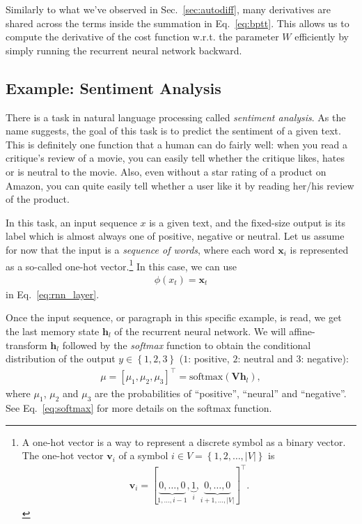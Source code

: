 \documentclass{report}
\newcommand{\softmax}{\text{softmax}}
\newcommand{\vect}[1]{\mathbf{#1}}
\newcommand{\matr}[1]{\mathbf{#1}}
\newcommand{\vh}[0]{\vect{h}}
\newcommand{\vv}[0]{\vect{v}}
\newcommand{\vx}[0]{\vect{x}}
\newcommand{\mV}[0]{\matr{V}}
\begin{document}
Similarly to what we've observed in Sec.~\ref{sec:autodiff}, many derivatives
are shared across the terms inside the summation in Eq.~\eqref{eq:bptt}. This
allows us to compute the derivative of the cost function w.r.t. the
parameter $W$ efficiently by simply running the recurrent neural network
backward. 

\subsection{Example: Sentiment Analysis}

There is a task in natural language processing called {\em sentiment analysis}.
As the name suggests, the goal of this task is to predict the sentiment of a
given text. This is definitely one function that a human can do fairly well:
when you read a critique's review of a movie, you can easily tell whether the
critique likes, hates or is neutral to the movie. Also, even without a star
rating of a product on Amazon, you can quite easily tell whether a user like it
by reading her/his review of the product.

In this task, an input sequence $x$ is a given text, and the fixed-size output
is its label which is almost always one of positive, negative or neutral. Let us
assume for now that the input is a {\em sequence of words}, where each word
$\vx_i$ is represented as a so-called one-hot vector.\footnote{
    A one-hot vector is a way to represent a discrete symbol as a binary vector.
    The one-hot vector $\vv_i$ of a symbol $i \in V = \left\{ 1, 2, \ldots, |V|
    \right\}$ is 
    \begin{align*}
        \vv_i = [ \underbrace{0, \ldots, 0}_{1,\ldots,i-1}, 
        \underbrace{1}_{i}, \underbrace{0, \ldots, 0}_{i+1, \ldots,
    |V|}]^\top.
    \end{align*}
} In this case, we can use 
\begin{align*}
    \phi(x_t) = \vx_t
\end{align*}
in Eq.~\eqref{eq:rnn_layer}.

Once the input sequence, or paragraph in this specific example, is read, we get
the last memory state $\vh_l$ of the recurrent neural network. We will
affine-transform $\vh_l$ followed by the {\em softmax} function to obtain the
conditional distribution of the output $y \in \left\{ 1, 2, 3 \right\}$ ($1$:
positive, $2$: neutral and $3$: negative):
\begin{align}
    \label{eq:multiclass}
    \mu = \left[ \mu_1, \mu_2, \mu_3 \right]^\top = \softmax(\mV \vh_l),
\end{align}
where $\mu_1$, $\mu_2$ and $\mu_3$ are the probabilities of ``positive'',
``neural'' and ``negative''. See Eq.~\eqref{eq:softmax} for more details on the
softmax function.
\end{document}

